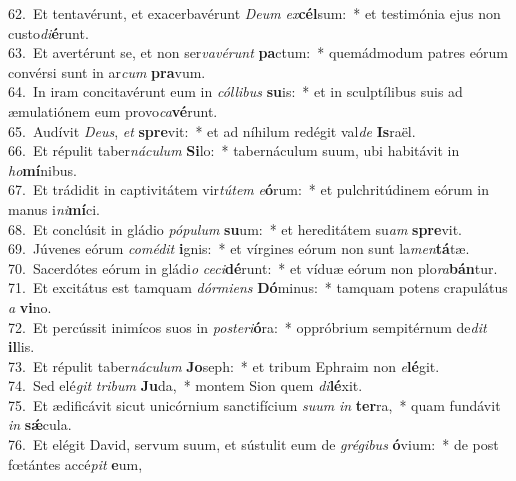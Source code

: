 {62.~}Et tentavérunt, et exacerbavérunt \textit{De}\textit{um} \textit{ex}\textbf{cél}sum:~* et testimónia ejus non custo\textit{di}\textbf{é}runt.\\
{63.~}Et avertérunt se, et non ser\textit{va}\textit{vé}\textit{runt} \textbf{pa}ctum:~* quemádmodum patres eórum convérsi sunt in ar\textit{cum} \textbf{pra}vum.\\
{64.~}In iram concitavérunt eum in \textit{cól}\textit{li}\textit{bus} \textbf{su}is:~* et in sculptílibus suis ad æmulatiónem eum provo\textit{ca}\textbf{vé}runt.\\
{65.~}Audívit \textit{De}\textit{us}, \textit{et} \textbf{spre}vit:~* et ad níhilum redégit val\textit{de} \textbf{Is}raël.\\
{66.~}Et répulit taber\textit{ná}\textit{cu}\textit{lum} \textbf{Si}lo:~* tabernáculum suum, ubi habitávit in \textit{ho}\textbf{mí}nibus.\\
{67.~}Et trádidit in captivitátem vir\textit{tú}\textit{tem} \textit{e}\textbf{ó}rum:~* et pulchritúdinem eórum in manus i\textit{ni}\textbf{mí}ci.\\
{68.~}Et conclúsit in gládio \textit{pó}\textit{pu}\textit{lum} \textbf{su}um:~* et hereditátem su\textit{am} \textbf{spre}vit.\\
{69.~}Júvenes eórum \textit{co}\textit{mé}\textit{dit} \textbf{i}gnis:~* et vírgines eórum non sunt la\textit{men}\textbf{tá}tæ.\\
{70.~}Sacerdótes eórum in gládi\textit{o} \textit{ce}\textit{ci}\textbf{dé}runt:~* et víduæ eórum non plo\textit{ra}\textbf{bán}tur.\\
{71.~}Et excitátus est tamquam \textit{dór}\textit{mi}\textit{ens} \textbf{Dó}minus:~* tamquam potens crapulátus \textit{a} \textbf{vi}no.\\
{72.~}Et percússit inimícos suos in \textit{po}\textit{ste}\textit{ri}\textbf{ó}ra:~* oppróbrium sempitérnum de\textit{dit} \textbf{il}lis.\\
{73.~}Et répulit taber\textit{ná}\textit{cu}\textit{lum} \textbf{Jo}seph:~* et tribum Ephraim non \textit{e}\textbf{lé}git.\\
{74.~}Sed elé\textit{git} \textit{tri}\textit{bum} \textbf{Ju}da,~* montem Sion quem \textit{di}\textbf{lé}xit.\\
{75.~}Et ædificávit sicut unicórnium sanctifícium \textit{su}\textit{um} \textit{in} \textbf{ter}ra,~* quam fundávit \textit{in} \textbf{sǽ}cula.\\
{76.~}Et elégit David, servum suum, et sústulit eum de \textit{gré}\textit{gi}\textit{bus} \textbf{ó}vium:~* de post fœtántes accé\textit{pit} \textbf{e}um,\\
